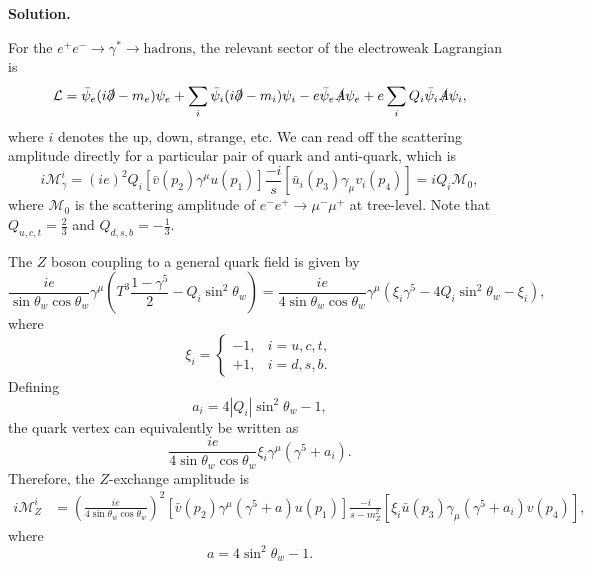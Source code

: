 \documentclass[a4paper,11pt]{article}
\newenvironment{solution}{\par\medskip\noindent\textbf{Solution.}\par\smallskip}{\par\medskip}
\begin{document}
\begin{solution}
For the $e^+e^- \to \gamma^* \to \mathrm{hadrons}$, the relevant sector of the electroweak Lagrangian is
\begin{equation}
    \mathcal{L} = \bar \psi_e(i\slashed{\partial} - m_e)\psi_e + \sum_i\bar{\psi}_i(i\slashed{\partial} - m_i)\psi_i - e\bar \psi_e\slashed{A}\psi_e + e\sum_i Q_i\bar\psi_i \slashed{A}\psi_i,
\end{equation}
where $i$ denotes the up, down, strange, etc.
We can read off the scattering amplitude directly for a particular pair of quark and anti-quark, which is
\begin{equation}
    i\mathcal{M}_\gamma^i = (ie)^2Q_i[\bar v(p_2)\gamma^\mu u(p_1)]\frac{-i}{s}[\bar u_i(p_3)\gamma_\mu v_i(p_4)] = iQ_i\mathcal{M}_0,
\end{equation}
where $\mathcal{M}_0$ is the scattering amplitude of $e^-e^+\to \mu^-\mu^+$ at tree-level. Note that $Q_{u,c,t} = \frac{2}{3}$ and $Q_{d,s,b} = -\frac{1}{3}$.

The $Z$ boson coupling to a general quark field is given by
\begin{equation}
    \frac{ie}{\sin\theta_w\cos\theta_w}
    \gamma^\mu
    \left(
        T^3\frac{1-\gamma^5}{2}
        -Q_i\sin^2\theta_w
    \right)
    =
    \frac{ie}{4\sin\theta_w\cos\theta_w}
    \gamma^\mu
    \left(
        \xi_i\gamma^5
        -4Q_i\sin^2\theta_w
        -\xi_i
    \right),
\end{equation}
where
\begin{equation}
    \xi_i=
    \begin{cases}
        -1, & i=u,c,t,\\
        +1, & i=d,s,b.
    \end{cases}
\end{equation}
Defining
\begin{equation}
    a_i=4|Q_i|\sin^2\theta_w-1,
\end{equation}
the quark vertex can equivalently be written as
\begin{equation}
    \frac{ie}{4\sin\theta_w\cos\theta_w}
    \xi_i\gamma^\mu(\gamma^5+a_i).
\end{equation}
Therefore, the $Z$-exchange amplitude is
\begin{equation}
\begin{aligned}
    i\mathcal{M}_Z^i
    &=
    \left(
        \frac{ie}{4\sin\theta_w\cos\theta_w}
    \right)^2
    \left[
        \bar v(p_2)\gamma^\mu(\gamma^5+a)u(p_1)
    \right]
    \frac{-i}{s-m_Z^2}
    \left[
        \xi_i\bar u(p_3)\gamma_\mu(\gamma^5+a_i)v(p_4)
    \right],
\end{aligned}
\end{equation}
where
\begin{equation}
    a=4\sin^2\theta_w-1.
\end{equation}


\end{solution}
\end{document}
